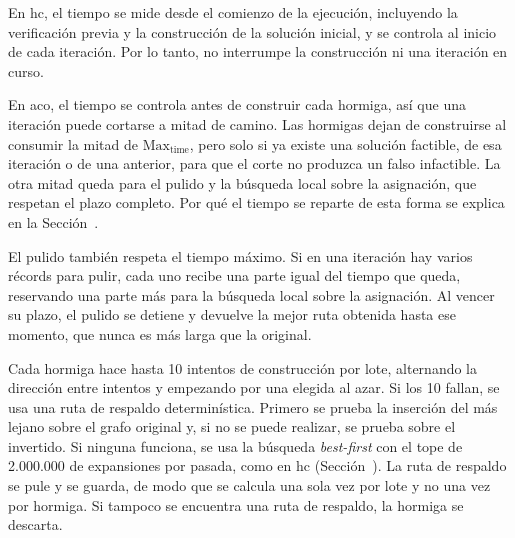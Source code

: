 \stopsubsection

\startsubsection[title={Control del tiempo}, reference=sec:anexo_tiempo]

En \ac{hc}, el tiempo se mide desde el comienzo de la ejecución, incluyendo
la verificación previa y la construcción de la solución inicial, y se
controla al inicio de cada iteración. Por lo tanto, no interrumpe la
construcción ni una iteración en curso.

En \ac{aco}, el tiempo se controla antes de construir cada hormiga, así que
una iteración puede cortarse a mitad de camino. Las hormigas dejan de
construirse al consumir la mitad de $\text{Max}_{\text{time}}$, pero solo si
ya existe una solución factible, de esa iteración o de una anterior, para
que el corte no produzca un falso infactible. La otra mitad queda para el
pulido y la búsqueda local sobre la asignación, que respetan el plazo
completo. Por qué el tiempo se reparte de esta forma se explica en la
Sección~.

El pulido también respeta el tiempo máximo. Si en una iteración hay varios
récords para pulir, cada uno recibe una parte igual del tiempo que queda,
reservando una parte más para la búsqueda local sobre la asignación. Al
vencer su plazo, el pulido se detiene y devuelve la mejor ruta obtenida
hasta ese momento, que nunca es más larga que la original.

\stopsubsection

\startsubsection[title={Intentos y ruta de respaldo en \ac{aco}}, reference=sec:anexo_aco_respaldo]

Cada hormiga hace hasta 10 intentos de construcción por lote, alternando la
dirección entre intentos y empezando por una elegida al azar. Si los 10
fallan, se usa una ruta de respaldo determinística. Primero se prueba la
inserción del más lejano sobre el grafo original y, si no se puede realizar,
se prueba sobre el invertido. Si ninguna funciona, se usa la búsqueda
{\em best-first} con el tope de 2.000.000 de expansiones por pasada, como en \ac{hc}
(Sección~). La ruta de respaldo se pule y se
guarda, de modo que se calcula una sola vez por lote y no una vez por
hormiga. Si tampoco se encuentra una ruta de respaldo, la hormiga se
descarta.

\stopsubsection

\stopsection

